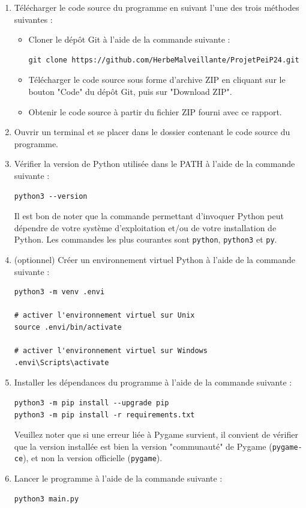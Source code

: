 \documentclass[12pt]{scrreprt} %
\begin{document}
\begin{enumerate}
    \item Télécharger le code source du programme en suivant l'une des trois méthodes suivantes :
          \begin{itemize}
              \item Cloner le dépôt Git à l'aide de la commande suivante :
                    \begin{verbatim}
git clone https://github.com/HerbeMalveillante/ProjetPeiP24.git      
              \end{verbatim}
              \item Télécharger le code source sous forme d'archive ZIP en cliquant sur le bouton "Code" du dépôt Git, puis sur "Download ZIP".
              \item Obtenir le code source à partir du fichier ZIP fourni avec ce rapport.
          \end{itemize}
    \item Ouvrir un terminal et se placer dans le dossier contenant le code source du programme.
    \item Vérifier la version de Python utilisée dans le PATH à l'aide de la commande suivante :
          \begin{verbatim}
python3 --version
    \end{verbatim}
          Il est bon de noter que la commande permettant d'invoquer Python peut dépendre de votre système d'exploitation et/ou de votre installation de Python. Les commandes les plus courantes sont \texttt{python}, \texttt{python3} et \texttt{py}.
    \item (optionnel) Créer un environnement virtuel Python à l'aide de la commande suivante :
          \begin{verbatim}
python3 -m venv .envi

# activer l'environnement virtuel sur Unix
source .envi/bin/activate

# activer l'environnement virtuel sur Windows
.envi\Scripts\activate
    \end{verbatim}
    \item Installer les dépendances du programme à l'aide de la commande suivante :
          \begin{verbatim}
python3 -m pip install --upgrade pip
python3 -m pip install -r requirements.txt
    \end{verbatim}
          Veuillez noter que si une erreur liée à Pygame survient, il convient de vérifier que la version installée est bien la version "communauté" de Pygame (\texttt{pygame-ce}), et non la version officielle (\texttt{pygame}).

    \item Lancer le programme à l'aide de la commande suivante :
          \begin{verbatim}
python3 main.py
    \end{verbatim}

\end{enumerate}
\end{document}
